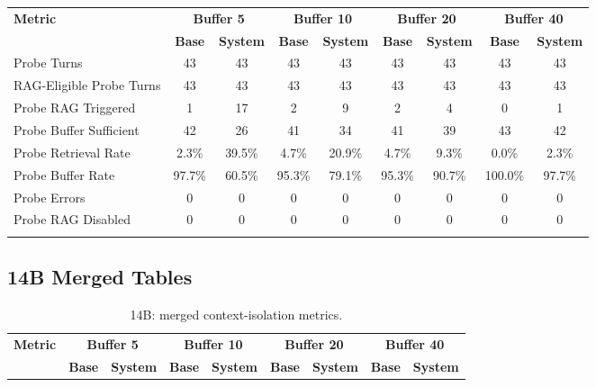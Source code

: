 \documentclass[pdflatex,sn-mathphys-num]{sn-jnl}%
\theoremstyle{thmstyleone}%
\theoremstyle{thmstyletwo}%
\theoremstyle{thmstylethree}%
\begin{document}
\begin{appendices}
\begin{landscape}
\begin{longtable}{@{}p{3.8cm}cccccccc@{}}
\toprule
\textbf{Metric} & \multicolumn{2}{c}{\textbf{Buffer 5}} & \multicolumn{2}{c}{\textbf{Buffer 10}} & \multicolumn{2}{c}{\textbf{Buffer 20}} & \multicolumn{2}{c}{\textbf{Buffer 40}} \\
\cmidrule(lr){2-3}\cmidrule(lr){4-5}\cmidrule(lr){6-7}\cmidrule(lr){8-9}
 & \textbf{Base} & \textbf{System} & \textbf{Base} & \textbf{System} & \textbf{Base} & \textbf{System} & \textbf{Base} & \textbf{System} \\
\midrule
\endhead
Probe Turns & 43 & 43 & 43 & 43 & 43 & 43 & 43 & 43 \\
RAG-Eligible Probe Turns & 43 & 43 & 43 & 43 & 43 & 43 & 43 & 43 \\
Probe RAG Triggered & 1 & 17 & 2 & 9 & 2 & 4 & 0 & 1 \\
Probe Buffer Sufficient & 42 & 26 & 41 & 34 & 41 & 39 & 43 & 42 \\
Probe Retrieval Rate & 2.3\% & 39.5\% & 4.7\% & 20.9\% & 4.7\% & 9.3\% & 0.0\% & 2.3\% \\
Probe Buffer Rate & 97.7\% & 60.5\% & 95.3\% & 79.1\% & 95.3\% & 90.7\% & 100.0\% & 97.7\% \\
Probe Errors & 0 & 0 & 0 & 0 & 0 & 0 & 0 & 0 \\
Probe RAG Disabled & 0 & 0 & 0 & 0 & 0 & 0 & 0 & 0 \\
\botrule
\end{longtable}
\normalsize
\end{landscape}

\subsection{14B Merged Tables}\label{app:14b_merged}
\begin{landscape}
\tiny
\begin{longtable}{@{}p{3.8cm}cccccccc@{}}
\caption{14B: merged context-isolation metrics.}\label{tab:app_14b_context}\\

\toprule
\textbf{Metric} & \multicolumn{2}{c}{\textbf{Buffer 5}} & \multicolumn{2}{c}{\textbf{Buffer 10}} & \multicolumn{2}{c}{\textbf{Buffer 20}} & \multicolumn{2}{c}{\textbf{Buffer 40}} \\
\cmidrule(lr){2-3}\cmidrule(lr){4-5}\cmidrule(lr){6-7}\cmidrule(lr){8-9}
 & \textbf{Base} & \textbf{System} & \textbf{Base} & \textbf{System} & \textbf{Base} & \textbf{System} & \textbf{Base} & \textbf{System} \\
\midrule
\endfirsthead


\end{longtable}
\end{landscape}
\end{appendices}
\end{document}
